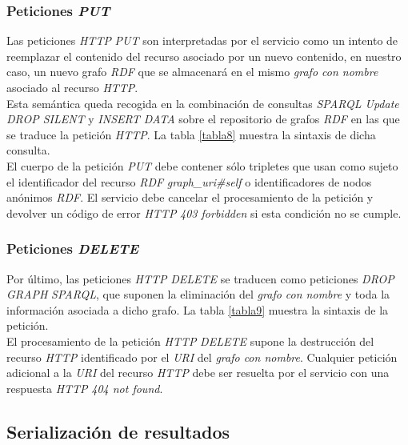 \subsubsection{Peticiones \textit{PUT}}

Las peticiones \textit{HTTP} \textit{PUT} son interpretadas por el servicio como un intento de reemplazar el contenido del recurso asociado por un nuevo contenido, en nuestro caso, un nuevo grafo \textit{RDF} que se almacenar\'a en el mismo \textit{grafo con nombre} asociado al recurso \textit{HTTP}.\\
Esta sem\'antica queda recogida en la combinaci\'on de consultas \textit{SPARQL Update} \textit{DROP SILENT} y \textit{INSERT DATA} sobre el repositorio de grafos \textit{RDF} en las que se traduce la petici\'on \textit{HTTP}. La tabla \ref{tabla8} muestra la sintaxis de dicha consulta.\\
El cuerpo de la petici\'on \textit{PUT} debe contener s\'olo tripletes que usan como sujeto el identificador del recurso \textit{RDF} \textit{graph\_uri\#self} o identificadores de nodos an\'onimos \textit{RDF}. El servicio debe cancelar el procesamiento de la petici\'on y devolver un c\'odigo de error \textit{HTTP} \textit{403 forbidden} si esta condici\'on no se cumple.

\subsubsection{Peticiones \textit{DELETE}}

Por \'ultimo, las peticiones \textit{HTTP} \textit{DELETE} se traducen como peticiones \textit{DROP GRAPH} \textit{SPARQL}, que suponen la eliminaci\'on del \textit{grafo con nombre} y toda la informaci\'on asociada a dicho grafo. La tabla \ref{tabla9} muestra la sintaxis de la petici\'on.\\
El procesamiento de la petici\'on \textit{HTTP} \textit{DELETE} supone la destrucci\'on del recurso \textit{HTTP} identificado por el \textit{URI} del \textit{grafo con nombre}. Cualquier petici\'on adicional a la \textit{URI} del recurso \textit{HTTP} debe ser resuelta por el servicio con una respuesta \textit{HTTP} \textit{404 not found}.

\subsection{Serializaci\'on de resultados}

